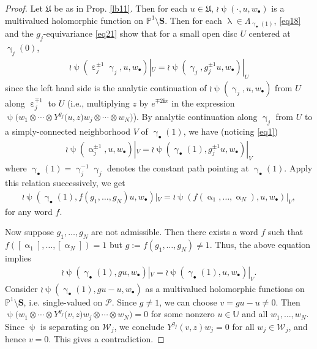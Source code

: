 \documentclass[11pt,b5paper,notitlepage]{article}
\theoremstyle{definition}
\theoremstyle{plain}
\newcommand{\fk}{\mathfrak}
\newcommand{\mc}{\mathcal}
\newcommand{\im}{\mathbf{i}}
\newcommand{\blt}{\bullet}
\newcommand{\Ubb}{\mathbb U}
\newcommand{\Pbb}{\mathbb P}
\newcommand{\Sbf}{\mathbf{S}}
\numberwithin{equation}{subsection}
\begin{document}
\begin{proof}
Let $\fk U$ be as in Prop. \ref{lb11}. Then for each $u\in\fk U$, $\wr\uppsi(\cdot,u,w_\blt)$ is a multivalued holomorphic function on $\Pbb^1\setminus\Sbf$.  Then for each $\uplambda\in\Lambda_{\upgamma_\blt(1)}$, \eqref{eq18} and the $g_j$-equivariance \eqref{eq21} show that for  a small open disc $U$ centered at $\upgamma_j(0)$,
	\begin{align*}
		\wr\uppsi(\upepsilon_j^{\pm 1}\upgamma_j,u,w_\blt)|_U=	\wr\uppsi(\upgamma_j,g_j^{\pm 1}u,w_\blt)|_U
	\end{align*}
	since the left hand side is the analytic continuation of $\wr\uppsi(\upgamma_j,u,w_\blt)$ from $U$ along $\upepsilon_j^{\mp 1}$ to $U$ (i.e.,  multiplying $z$ by $e^{\mp2\im\pi}$   in the expression $\uppsi\big(w_1\otimes\cdots\otimes Y^{g_j}\big(u,z\big)w_j\otimes\cdots\otimes w_N\big)$). By analytic continuation along $\upgamma_j$ from $U$ to a simply-connected neighborhood $V$ of $\upgamma_\blt(1)$, we have (noticing \eqref{eq1})
	\begin{align}
		\wr\uppsi(\upalpha_j^{\pm1},u,w_\blt)|_V=	\wr\uppsi(\upgamma_\blt(1),g_j^{\pm1}u,w_\blt)|_V\label{eq42}
	\end{align}
	where $\upgamma_\blt(1)=\upgamma_j^{-1}\upgamma_j$ denotes the constant path pointing at $\upgamma_\blt(1)$. Apply this relation successively, we get
	\begin{align*}
		\wr\uppsi(\upgamma_\blt(1),f(g_1,\dots,g_N)u,w_\blt)|_V=\wr\uppsi(f(\upalpha_1,\dots,\upalpha_N),u,w_\blt)|_V,
	\end{align*}
for any word $f$.

Now suppose $g_1,\dots,g_N$ are not admissible. Then there exists a word $f$ such that $f([\upalpha_1],\dots,[\upalpha_N])=1$ but $g:=f(g_1,\dots,g_N)\neq 1$. Thus, the above equation implies 	\begin{align*}
\wr\uppsi(\upgamma_\blt(1),gu,w_\blt)|_V=\wr\uppsi(\upgamma_\blt(1),u,w_\blt)|_V.
\end{align*}
Consider $\wr\uppsi(\upgamma_\blt(1),gu-u,w_\blt)$ as a multivalued holomorphic functions on $\Pbb^1\setminus\Sbf$, i.e. single-valued on $\mc P$. Since $g\neq 1$, we can choose $v=gu-u\neq 0$. Then $\uppsi\big(w_1\otimes\cdots\otimes Y^{g_j}\big(v,z\big)w_j\otimes\cdots\otimes w_N\big)=0$ for some nonzero $u\in\Ubb$ and all $w_1,\dots,w_N$. Since $\uppsi$ is separating on $\mc W_j$, we conclude $Y^{g_j}(v,z)w_j=0$ for all $w_j\in\mc W_j$, and hence $v=0$. This gives a contradiction. 
\end{proof}
\end{document}
